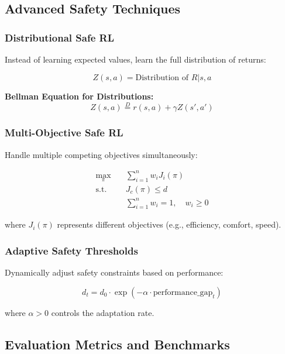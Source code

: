 \documentclass[12pt]{article}
\begin{document}
{{{{\subsection{Advanced Safety Techniques}

\subsubsection{Distributional Safe RL}

Instead of learning expected values, learn the full distribution of returns:

\begin{equation}
Z(s,a) = \text{Distribution of } R|s,a
\end{equation}

\textbf{Bellman Equation for Distributions:}
\begin{equation}
Z(s,a) \overset{D}{=} r(s,a) + \gamma Z(s', a')
\end{equation}

\subsubsection{Multi-Objective Safe RL}

Handle multiple competing objectives simultaneously:

\begin{align}
\max_{\pi} \quad & \sum_{i=1}^{n} w_i J_i(\pi) \\
\text{s.t.} \quad & J_c(\pi) \leq d \\
& \sum_{i=1}^{n} w_i = 1, \quad w_i \geq 0
\end{align}

where $J_i(\pi)$ represents different objectives (e.g., efficiency, comfort, speed).

\subsubsection{Adaptive Safety Thresholds}

Dynamically adjust safety constraints based on performance:

\begin{equation}
d_t = d_0 \cdot \exp(-\alpha \cdot \text{performance\_gap}_t)
\end{equation}

where $\alpha > 0$ controls the adaptation rate.

\subsection{Evaluation Metrics and Benchmarks}

}}}}
\end{document}
